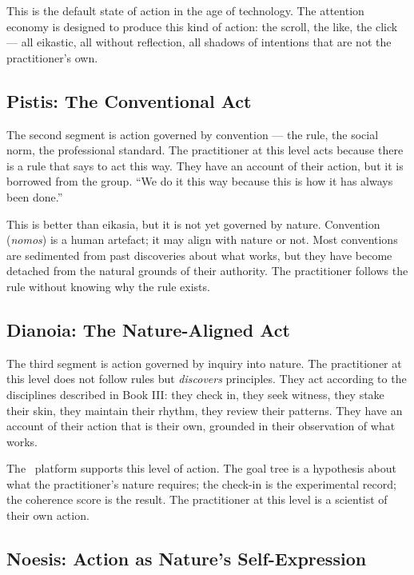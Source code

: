 This is the default state of action in the age of technology. The attention
economy is designed to produce this kind of action: the scroll, the like, the
click --- all eikastic, all without reflection, all shadows of intentions that
are not the practitioner's own.

\subsection{Pistis: The Conventional Act}

The second segment is action governed by convention --- the rule, the social
norm, the professional standard. The practitioner at this level acts because
there is a rule that says to act this way. They have an account of their action,
but it is borrowed from the group. ``We do it this way because this is how it
has always been done.''

This is better than eikasia, but it is not yet governed by nature. Convention
(\emph{nomos}) is a human artefact; it may align with nature or not. Most
conventions are sedimented from past discoveries about what works, but they
have become detached from the natural grounds of their authority. The
practitioner follows the rule without knowing why the rule exists.

\subsection{Dianoia: The Nature-Aligned Act}

The third segment is action governed by inquiry into nature. The practitioner
at this level does not follow rules but \emph{discovers} principles. They act
according to the disciplines described in Book III: they check in, they seek
witness, they stake their skin, they maintain their rhythm, they review their
patterns. They have an account of their action that is their own, grounded in
their observation of what works.

The \praxis\ platform supports this level of action. The goal tree is a
hypothesis about what the practitioner's nature requires; the check-in is the
experimental record; the coherence score is the result. The practitioner at
this level is a scientist of their own action.

\subsection{Noesis: Action as Nature's Self-Expression}


